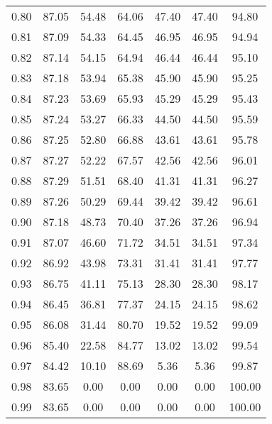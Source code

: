 \begin{tabular}{|c|c|c|c|c|c|c|}
      0.80 &     87.05 &     54.48 &      64.06 &   47.40 &      47.40 &         94.80 \\
      0.81 &     87.09 &     54.33 &      64.45 &   46.95 &      46.95 &         94.94 \\
      0.82 &     87.14 &     54.15 &      64.94 &   46.44 &      46.44 &         95.10 \\
      0.83 &     87.18 &     53.94 &      65.38 &   45.90 &      45.90 &         95.25 \\
      0.84 &     87.23 &     53.69 &      65.93 &   45.29 &      45.29 &         95.43 \\
      0.85 &     87.24 &     53.27 &      66.33 &   44.50 &      44.50 &         95.59 \\
      0.86 &     87.25 &     52.80 &      66.88 &   43.61 &      43.61 &         95.78 \\
      0.87 &     87.27 &     52.22 &      67.57 &   42.56 &      42.56 &         96.01 \\
      0.88 &     87.29 &     51.51 &      68.40 &   41.31 &      41.31 &         96.27 \\
      0.89 &     87.26 &     50.29 &      69.44 &   39.42 &      39.42 &         96.61 \\
      0.90 &     87.18 &     48.73 &      70.40 &   37.26 &      37.26 &         96.94 \\
      0.91 &     87.07 &     46.60 &      71.72 &   34.51 &      34.51 &         97.34 \\
      0.92 &     86.92 &     43.98 &      73.31 &   31.41 &      31.41 &         97.77 \\
      0.93 &     86.75 &     41.11 &      75.13 &   28.30 &      28.30 &         98.17 \\
      0.94 &     86.45 &     36.81 &      77.37 &   24.15 &      24.15 &         98.62 \\
      0.95 &     86.08 &     31.44 &      80.70 &   19.52 &      19.52 &         99.09 \\
      0.96 &     85.40 &     22.58 &      84.77 &   13.02 &      13.02 &         99.54 \\
      0.97 &     84.42 &     10.10 &      88.69 &    5.36 &       5.36 &         99.87 \\
      0.98 &     83.65 &      0.00 &       0.00 &    0.00 &       0.00 &        100.00 \\
      0.99 &     83.65 &      0.00 &       0.00 &    0.00 &       0.00 &        100.00 \\
\bottomrule
\end{tabular}
